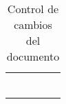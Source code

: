 \begin{table}[h]
\begin{tabular}{lllll}
	\multicolumn{1}{|l}{}                                         &                                        &                                        & \multicolumn{1}{l|}{}                                         &  \\ \cline{1-4}
	\multicolumn{1}{|l}{}                                         &                                        &                                        & \multicolumn{1}{l|}{}                                         &  \\ \cline{1-4}
	\multicolumn{1}{|l}{}                                         &                                        &                                        & \multicolumn{1}{l|}{}                                         &  \\ \cline{1-4}
	\multicolumn{1}{|l}{}                                         &                                        &                                        & \multicolumn{1}{l|}{}                                         &  \\ \cline{1-4}
	&                                        &                                        &                                                               &  \\
	&                                        &                                        &                                                               & 
\end{tabular}
	\caption{Control de cambios del documento}
	\label{table:cambios_doc}
\end{table}
